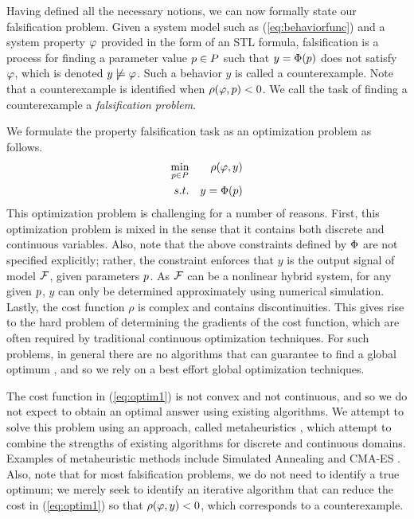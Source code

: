 Having defined all the necessary notions, we can now formally state our falsification problem.
Given a system model such as (\ref{eq:behaviorfunc}) and a system property $\varphi$ provided in the form of an STL formula, 
falsification is a process for finding a parameter value $p \in P$
such that $y=\Phi(p)$ does not satisfy $\varphi$, which is denoted $y
\not\models \varphi$. Such a behavior $y$ is called a counterexample. 
Note that a counterexample is identified when 
$\rho(\varphi,p)<0$. We call the task of finding a counterexample 
a {\em falsification problem}. 


We formulate the property falsification task as an optimization problem as follows.
\begin{eqnarray} \label{eq:optim1}
\min_{p \in P} && \rho(\varphi,y) \\ \nonumber
s.t. && y=\Phi(p)
\end{eqnarray}
This optimization problem is challenging for a number of reasons. First, this optimization problem is mixed in the sense that it contains both discrete and continuous variables. Also, note that the above constraints defined by $\Phi$ 
are not specified explicitly; rather, the constraint enforces that $y$ is the output signal of model $\mathcal{F}$, given parameters $p$.
As $\mathcal{F}$ can be a nonlinear hybrid system, for any given $p$, $y$ can only be determined approximately using numerical simulation. 
Lastly, the cost function $\rho$ is complex and contains discontinuities.
This gives rise to the hard problem of determining the gradients of the cost function, which are often required by traditional continuous optimization techniques. 
For such problems, in general there are no algorithms that can guarantee to find a global optimum \cite{FloudasPardalos2009}, and so we rely on a best effort global optimization techniques. 

The cost function in (\ref{eq:optim1}) is not convex and not continuous, and so we do not expect to obtain an optimal answer using existing algorithms. We attempt to solve this problem using an approach, called metaheuristics \cite{dreo:hal-01341683}, which attempt to combine the strengths of existing algorithms for discrete and continuous domains. Examples of metaheuristic methods include Simulated Annealing \cite{Kirkpatrick83optimizationby} and CMA-ES \cite{hansen2006eda}. Also, note that for most falsification problems, we do not need to identify a true optimum; we merely seek to identify an iterative algorithm that can reduce the cost in (\ref{eq:optim1}) so that $\rho(\varphi,y)<0$, which corresponds to a counterexample.

